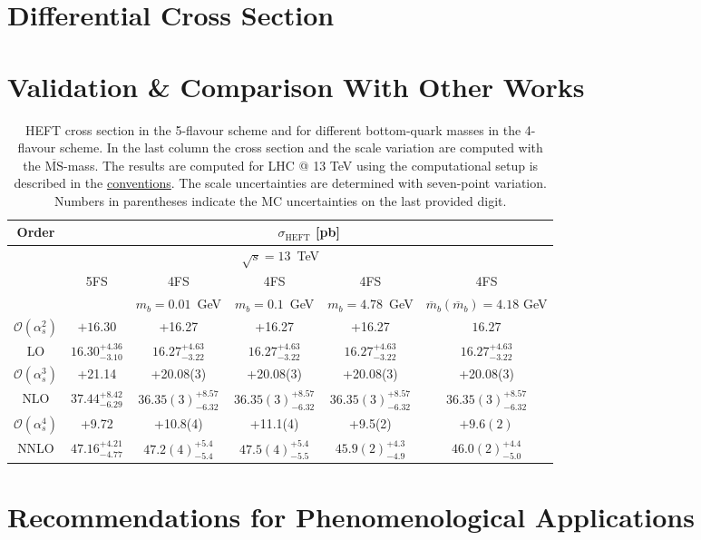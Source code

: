 \section{Differential Cross Section}

\section{Validation \& Comparison With Other Works}

\begin{table*}
\centering
\begin{tabular}{cccccc}
\hline
Order & \multicolumn{5}{c}{$\sigma_\text{HEFT}$ [pb]} \\
\hline
\hline
\multicolumn{6}{c}{$\sqrt{s}=13$~TeV} \\
\hline
& 5FS & 4FS  & 4FS & 4FS & 4FS  \\
& & $m_b=0.01$~GeV &  $m_b=0.1$~GeV & $m_b=4.78$~GeV & $\overline{m}_b(\overline{m}_b) = 4.18$ GeV \\
\hline
$\mathcal{O}(\alpha_s^2)$ & $+16.30$ & +16.27 & +16.27 & +16.27 & $16.27$\\
LO & $16.30^{+4.36}_{-3.10}$ & $16.27^{+4.63}_{-3.22}$ & $16.27^{+4.63}_{-3.22}$ & $16.27^{+4.63}_{-3.22}$ & $16.27^{+4.63}_{-3.22}$ \\
\hline
$\mathcal{O}(\alpha_s^3)$ & +21.14 & +20.08(3) & +20.08(3) & +20.08(3) & +20.08(3) \\
NLO & $37.44^{+8.42}_{-6.29}$ & $36.35(3)^{+8.57}_{-6.32}$ & $36.35(3)^{+8.57}_{-6.32}$ & $36.35(3)^{+8.57}_{-6.32}$ & $36.35(3)^{+8.57}_{-6.32}$ \\
\hline
$\mathcal{O}(\alpha_s^4)$ & +9.72 & +10.8(4) & +11.1(4) & +9.5(2) & $+9.6(2)$ \\
NNLO & $47.16^{+4.21}_{-4.77}$ & $47.2(4)^{+5.4}_{-5.4}$ & $47.5(4)^{+5.4}_{-5.5}$ & $45.9(2)^{+4.3}_{-4.9}$ & $46.0(2)^{+4.4}_{-5.0}$\\
\hline
\end{tabular}
\caption{HEFT cross section in the 5-flavour scheme and for different bottom-quark masses in the 4-flavour scheme. In the last column the cross section and the scale variation are computed with the $\overline{\text{MS}}$-mass. The results are computed for LHC @ 13 TeV using the computational setup is described in the \hyperref[chap:notation_and_conventions]{conventions}. The scale uncertainties are determined with seven-point variation. Numbers in parentheses indicate the \acs{MC} uncertainties on the last provided digit.}
\label{tab:6:HEFT_4fs}
\end{table*}

\section{Recommendations for Phenomenological Applications}


